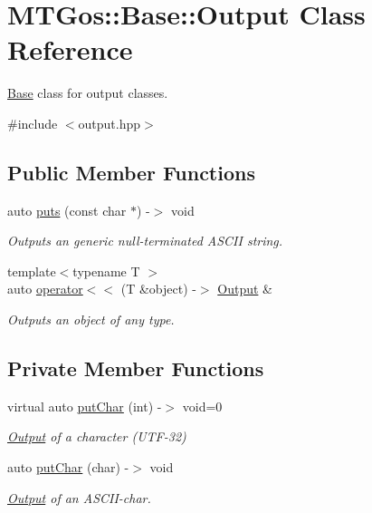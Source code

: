 \hypertarget{class_m_t_gos_1_1_base_1_1_output}{}\section{M\+T\+Gos\+:\+:Base\+:\+:Output Class Reference}
\label{class_m_t_gos_1_1_base_1_1_output}


\hyperlink{namespace_m_t_gos_1_1_base}{Base} class for output classes.  




{\ttfamily \#include $<$output.\+hpp$>$}

\subsection*{Public Member Functions}
\begin{DoxyCompactItemize}
\item 
auto \hyperlink{class_m_t_gos_1_1_base_1_1_output_a484df9ac6db83924c80118154f7088a1}{puts} (const char $\ast$) -\/$>$ void
\begin{DoxyCompactList}\small\item\em Outputs an generic null-\/terminated A\+S\+C\+I\+I string. \end{DoxyCompactList}\item 
{\footnotesize template$<$typename T $>$ }\\auto \hyperlink{class_m_t_gos_1_1_base_1_1_output_a6144d124dcb9299c2b95963b8ac7ad54}{operator$<$$<$} (T \&object) -\/$>$ \hyperlink{class_m_t_gos_1_1_base_1_1_output}{Output} \&
\begin{DoxyCompactList}\small\item\em Outputs an object of any type. \end{DoxyCompactList}\end{DoxyCompactItemize}
\subsection*{Private Member Functions}
\begin{DoxyCompactItemize}
\item 
virtual auto \hyperlink{class_m_t_gos_1_1_base_1_1_output_a9e3a286afa694700d5cf7666cf22d2e8}{put\+Char} (int) -\/$>$ void=0
\begin{DoxyCompactList}\small\item\em \hyperlink{class_m_t_gos_1_1_base_1_1_output}{Output} of a character (U\+T\+F-\/32) \end{DoxyCompactList}\item 
auto \hyperlink{class_m_t_gos_1_1_base_1_1_output_a203883edb598ced80d97be427ad07dbe}{put\+Char} (char) -\/$>$ void
\begin{DoxyCompactList}\small\item\em \hyperlink{class_m_t_gos_1_1_base_1_1_output}{Output} of an A\+S\+C\+I\+I-\/char. \end{DoxyCompactList}\end{DoxyCompactItemize}

